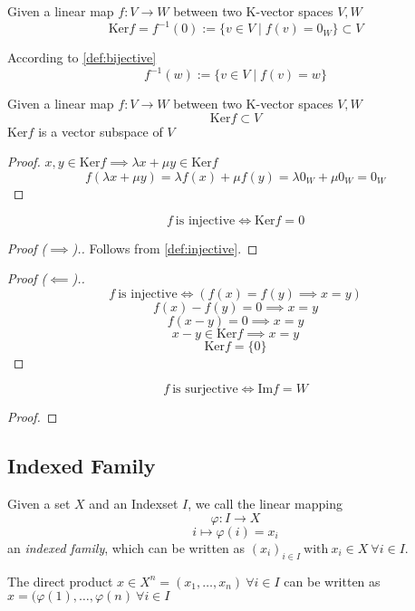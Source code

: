 \begin{definition}[Kernel]
   Given a linear map \(f: V \to W\) between two K-vector spaces \(V, W\)
   \[\text{Ker}f = f^{-1}(0) := \{v \in V \mid f(v) = 0_{W}\} \subset V\]
\end{definition}
\begin{remark}
   According to \cref{def:bijective}
   \[f^{-1}(w) := \{v \in V \mid f(v) = w\}\]
\end{remark}

\begin{proposition}
   Given a linear map \(f: V \to W\) between two K-vector spaces \(V, W\)
   \[\text{Ker}f \subset V\]
   \(\text{Ker}f\) is a vector subspace of \(V\)
\end{proposition}
\begin{proof}
   \(x, y \in \text{Ker}f \implies \lambda x + \mu y \in \text{Ker}f\)
   \[f(\lambda x + \mu y) = \lambda f(x) + \mu f(y) = \lambda 0_{W} + \mu 0_{W} = 0_{W}\]
\end{proof}

\begin{proposition}[\(\text{Ker}f = 0\)]\label{pro:kerf=0}
   \[f~\text{is injective} \iff \text{Ker}f = 0\]
\end{proposition}
\begin{proof}[Proof (\(\implies\)).]
   Follows from \cref{def:injective}.
\end{proof}
\begin{proof}[Proof (\(\impliedby\)).]
   \[f~\text{is injective} \iff (f(x) = f(y) \implies x = y)\]
   \[f(x) - f(y) = 0 \implies x = y\]
   \[f(x-y) = 0 \implies x = y\]
   \[x-y \in \text{Ker}f \implies x = y\]
   \[\text{Ker}f = \{0\}\]
\end{proof}

\begin{proposition}[\(\text{Im}f = W\)]
   \[f~\text{is surjective} \iff \text{Im}f = W\]
\end{proposition}
\begin{proof}
\end{proof}

\subsection{Indexed Family}
\begin{definition}\label{def:index_fam}
   Given a set \(X\) and an Indexset \(I\), we call the linear mapping
   \[\varphi: I \to X\]
   \[i \mapsto \varphi(i) = x_i\]
   an \textit{indexed family}, which can be written as \((x_i)_{i \in I}~\text{with}~x_i \in X~\forall i \in I\).
\end{definition}
The direct product \(x \in X^n = (x_1, \ldots, x_n)~\forall i \in I\) can be written as \(x = (\varphi(1), \ldots, \varphi(n)~\forall i \in I\)

